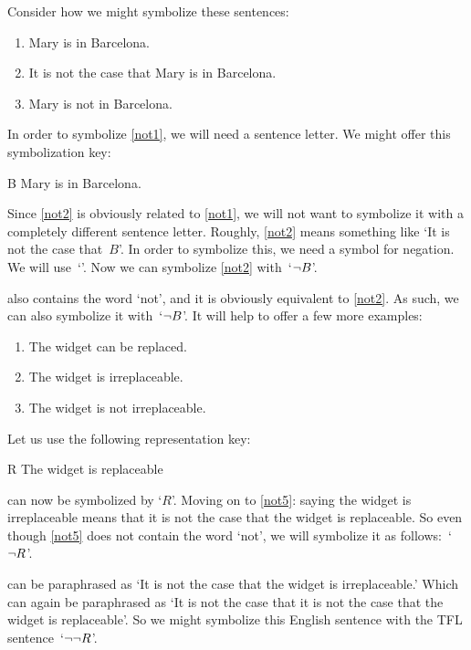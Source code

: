 Consider how we might symbolize these sentences:
	\begin{enumerate}
	\item\label{not1} Mary is in Barcelona.
	\item\label{not2} It is not the case that Mary is in Barcelona.
	\item\label{not3} Mary is not in Barcelona.
	\end{enumerate}
In order to symbolize \cref*{not1}, we will need a sentence letter. We might offer this symbolization key:
	\begin{ekey}
		\item[B] Mary is in Barcelona.
	\end{ekey}
Since \cref*{not2} is obviously related to \cref*{not1}, we will not want to symbolize it with a completely different sentence letter. Roughly, \cref*{not2} means something like `It is not the case that~$B$'. In order to symbolize this, we need a symbol for negation. We will use~`\enot'. Now we can symbolize \cref*{not2} with~`$\neg B$'.

 also contains the word `not', and it is obviously equivalent to \cref*{not2}. As such, we can also symbolize it with~`$\neg B$'.
It will help to offer a few more examples:
	\begin{enumerate}
		\item\label{not4} The widget can be replaced.
		\item\label{not5} The widget is irreplaceable.
		\item\label{not5b} The widget is not irreplaceable.
	\end{enumerate}
Let us use the following representation key:
	\begin{ekey}
		\item[R] The widget is replaceable
	\end{ekey}
 can now be symbolized by `$R$'. Moving on to \cref*{not5}: saying the widget is irreplaceable means that it is not the case that the widget is replaceable. So even though \cref*{not5} does not contain the word `not', we will symbolize it as follows:~`$\neg R$'.

 can be paraphrased as `It is not the case that the widget is irreplaceable.' Which can again be paraphrased as `It is not the case that it is not the case that the widget is replaceable'. So we might symbolize this English sentence with the TFL sentence~`$\neg\neg R$'.

